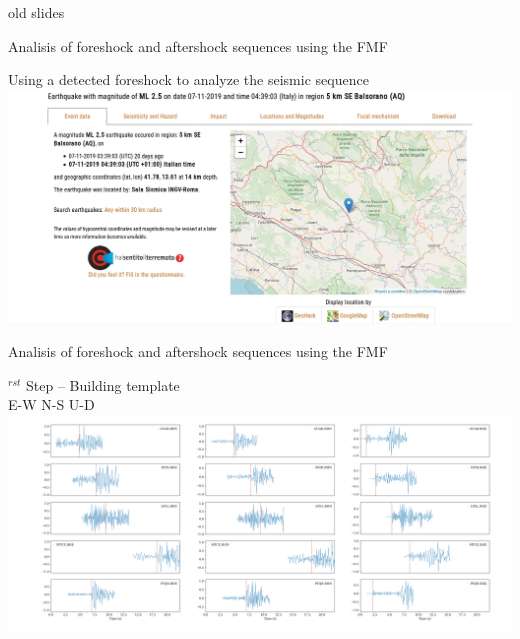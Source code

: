\documentclass[aspectratio=43,9pt]{beamer}
\begin{document}
\pagebreak


\begin{frame}
 
 \centering old slides
 
\end{frame}


\begin{frame}{Analisis of foreshock and aftershock sequences using the FMF}
 
  \hskip -1.3cm \begin{minipage}{1\linewidth}
    \centering Using a detected foreshock to analyze the seismic sequence \\
    \vskip 0.4cm
    \centering \includegraphics[width=1.2\linewidth]{figs/1_fore_shock}
  \end{minipage}
   
\end{frame}


\begin{frame}{Analisis of foreshock and aftershock sequences using the FMF}

  \hskip -1.5cm \begin{minipage}{1\linewidth}
    $^{rst}$ Step -- Building template \\
    \vskip 0.2cm
    \centering E-W  \hskip 3.5cm  N-S \hskip 3.8cm U-D \\
    \centering \includegraphics[width=1.2\linewidth]{figs/2_ml_2p5_2019-11-07_phase_arrivals}
  \end{minipage}

\end{frame}
\end{document}
